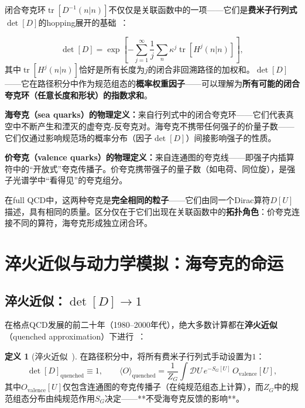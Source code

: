 \documentclass[12pt,a4paper]{ctexart}
\theoremstyle{definition}
\newtheorem{definition}{定义}[section]
\begin{document}
闭合夸克环$\operatorname{tr}[D^{-1}(n|n)]$不仅仅是关联函数中的一项——它们是\textbf{费米子行列式}$\det[D]$的hopping展开的基础~\cite{GattringerLang2010}：

\begin{equation}
\det[D] = \exp\!\left[-\sum_{j=1}^\infty \frac{1}{j}\sum_n \kappa^j \operatorname{tr}[H^j(n|n)]\right],
\label{eq:determinant_hopping}
\end{equation}
其中$\operatorname{tr}[H^j(n|n)]$恰好是所有长度为$j$的闭合非回溯路径的加权和。$\det[D]$——它在路径积分中作为规范组态的\textbf{概率权重因子}——可以理解为\textbf{所有可能的闭合夸克环（任意长度和形状）的指数求和}。

\textbf{海夸克（sea quarks）的物理定义：}来自行列式中的闭合夸克环——它们代表真空中不断产生和湮灭的虚夸克-反夸克对。海夸克不携带任何强子的价量子数——它们仅通过影响规范场的概率分布（因子$\det[D]$）间接影响强子的性质。

\textbf{价夸克（valence quarks）的物理定义：}来自连通图的夸克线——即强子内插算符中的``开放式''夸克传播子。价夸克携带强子的量子数（如电荷、同位旋），是强子光谱学中``看得见''的夸克组分。

在full QCD中，这两种夸克是\textbf{完全相同的粒子}——它们由同一个Dirac算符$D[U]$描述，具有相同的质量。区分仅在于它们出现在关联函数中的\textbf{拓扑角色}：价夸克连接不同的算符，海夸克形成独立闭合环。

\section{淬火近似与动力学模拟：海夸克的命运}

\subsection{淬火近似：$\det[D] \to 1$}

在格点QCD发展的前二十年（1980--2000年代），绝大多数计算都在\textbf{淬火近似}（quenched approximation）下进行~\cite{GattringerLang2010,Gupta1997intro}：

\begin{definition}[淬火近似~\cite{GattringerLang2010}]
在路径积分中，将所有费米子行列式手动设置为$1$：
\begin{equation}
\det[D]_{\text{quenched}} \equiv 1, \qquad
\langle O \rangle_{\text{quenched}} = \frac{1}{Z_G} \int\mathcal{D}U\, e^{-S_G[U]}\, O_{\text{valence}}[U],
\label{eq:quenched}
\end{equation}
其中$O_{\text{valence}}[U]$仅包含连通图的夸克传播子（在纯规范组态上计算），而$Z_G$中的规范组态分布由纯规范作用$S_G$决定——**不受海夸克反馈的影响**。
\end{definition}
\end{document}
